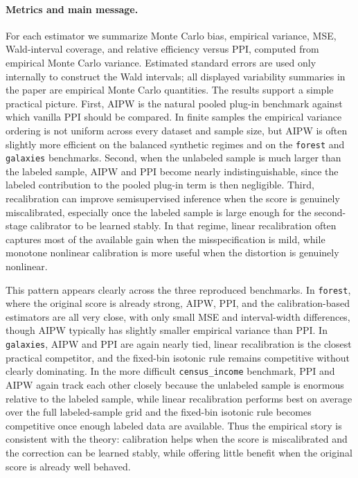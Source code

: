 \documentclass{article}
\begin{document}
\paragraph{Metrics and main message.}
For each estimator we summarize Monte Carlo bias, empirical variance, MSE, Wald-interval coverage, and relative efficiency versus PPI, computed from empirical Monte Carlo variance. Estimated standard errors are used only internally to construct the Wald intervals; all displayed variability summaries in the paper are empirical Monte Carlo quantities. The results support a simple practical picture. First, AIPW is the natural pooled plug-in benchmark against which vanilla PPI should be compared. In finite samples the empirical variance ordering is not uniform across every dataset and sample size, but AIPW is often slightly more efficient on the balanced synthetic regimes and on the \texttt{forest} and \texttt{galaxies} benchmarks. Second, when the unlabeled sample is much larger than the labeled sample, AIPW and PPI become nearly indistinguishable, since the labeled contribution to the pooled plug-in term is then negligible. Third, recalibration can improve semisupervised inference when the score is genuinely miscalibrated, especially once the labeled sample is large enough for the second-stage calibrator to be learned stably. In that regime, linear recalibration often captures most of the available gain when the misspecification is mild, while monotone nonlinear calibration is more useful when the distortion is genuinely nonlinear.

This pattern appears clearly across the three reproduced benchmarks. In \texttt{forest}, where the original score is already strong, AIPW, PPI, and the calibration-based estimators are all very close, with only small MSE and interval-width differences, though AIPW typically has slightly smaller empirical variance than PPI. In \texttt{galaxies}, AIPW and PPI are again nearly tied, linear recalibration is the closest practical competitor, and the fixed-bin isotonic rule remains competitive without clearly dominating. In the more difficult \texttt{census\_income} benchmark, PPI and AIPW again track each other closely because the unlabeled sample is enormous relative to the labeled sample, while linear recalibration performs best on average over the full labeled-sample grid and the fixed-bin isotonic rule becomes competitive once enough labeled data are available. Thus the empirical story is consistent with the theory: calibration helps when the score is miscalibrated and the correction can be learned stably, while offering little benefit when the original score is already well behaved.
\end{document}
